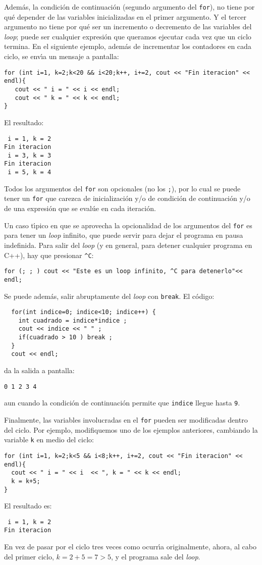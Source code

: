 Adem\'as, la condici\'on de continuaci\'on (segundo argumento del
\verb+for+), no tiene por qu\'e depender de las variables
inicializadas en el primer argumento. Y el tercer argumento no tiene
por qu\'e ser un incremento o decremento de las variables del \textit{loop};
puede ser cualquier expresi\'on que queramos ejecutar cada vez que un
ciclo termina. En el siguiente ejemplo, adem\'as de incrementar los
contadores en cada ciclo, se env\'{\i}a un mensaje a pantalla:
\begin{verbatim}
for (int i=1, k=2;k<20 && i<20;k++, i+=2, cout << "Fin iteracion" << endl){
   cout << " i = " << i << endl;
   cout << " k = " << k << endl;
}
\end{verbatim}
El resultado: 
\begin{verbatim}
 i = 1, k = 2
Fin iteracion
 i = 3, k = 3
Fin iteracion
 i = 5, k = 4
\end{verbatim}


Todos los argumentos del \verb+for+ son opcionales (no los \verb+;+),
por lo cual se puede tener un \verb|for| que carezca de inicializaci{\'o}n
y/o de condici{\'o}n de continuaci{\'o}n y/o de una expresi{\'o}n que
se eval{\'u}e en 
cada iteraci{\'o}n. 

Un caso t\'{\i}pico en que se aprovecha la opcionalidad de los
argumentos del \verb+for+ es para tener un {\it loop\/} infinito, que
puede servir para dejar el programa en pausa indefinida. Para salir
del {\it loop\/} (y en general, para detener cualquier programa en
C++), hay que presionar \verb+^C+:
\begin{verbatim}
for (; ; ) cout << "Este es un loop infinito, ^C para detenerlo"<< endl;
\end{verbatim}

Se puede adem{\'a}s, salir abruptamente del {\it loop\/} con
\verb+break+. El c\'odigo:
\begin{verbatim}
  for(int indice=0; indice<10; indice++) {
    int cuadrado = indice*indice ;
    cout << indice << " " ;
    if(cuadrado > 10 ) break ;
  }
  cout << endl;
\end{verbatim}
da la salida a pantalla:
\begin{verbatim}
0 1 2 3 4
\end{verbatim}
aun cuando la condici\'on de continuaci\'on permite que \verb+indice+
llegue hasta \verb+9+.

Finalmente, las variables involucradas en el \verb+for+ pueden ser
modificadas dentro del ciclo. Por ejemplo, modifiquemos uno de los
ejemplos anteriores, cambiando la variable \verb+k+ en medio del ciclo:
\begin{verbatim}
for (int i=1, k=2;k<5 && i<8;k++, i+=2, cout << "Fin iteracion" << endl){
  cout << " i = " << i  << ", k = " << k << endl;
  k = k+5;
}
\end{verbatim}
El resultado es:
\begin{verbatim}
 i = 1, k = 2
Fin iteracion
\end{verbatim}
En vez de pasar por el ciclo tres veces como ocurr\'{\i}a
originalmente, ahora, al cabo del primer ciclo,  $k=2+5=7>5$, y el
programa sale del {\it loop}. 

